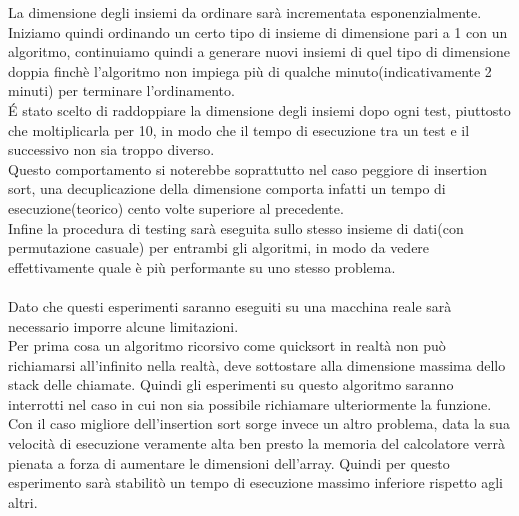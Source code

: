 \documentclass[]{article}
\begin{document}
La dimensione degli insiemi da ordinare sarà incrementata esponenzialmente.\\
Iniziamo quindi ordinando un certo tipo di insieme di dimensione pari a 1 con un algoritmo, continuiamo quindi a generare nuovi insiemi di quel tipo di dimensione doppia finchè l'algoritmo non impiega più di qualche minuto(indicativamente 2 minuti) per terminare l'ordinamento.\\
\'E stato scelto di raddoppiare la dimensione degli insiemi dopo ogni test, piuttosto che moltiplicarla per 10, in modo che il tempo di esecuzione tra un test e il successivo non sia troppo diverso.\\
Questo comportamento si noterebbe soprattutto nel caso peggiore di insertion sort, una decuplicazione della dimensione comporta infatti un tempo di esecuzione(teorico) cento volte superiore al precedente.\\
Infine la procedura di testing sarà eseguita sullo stesso insieme di dati(con permutazione casuale) per entrambi gli algoritmi, in modo da vedere effettivamente quale è più performante su uno stesso problema.\\\\
Dato che questi esperimenti saranno eseguiti su una macchina reale sarà necessario imporre alcune limitazioni.\\
Per prima cosa un algoritmo ricorsivo come quicksort in realtà non può richiamarsi all'infinito nella realtà, deve sottostare alla dimensione massima dello stack delle chiamate. Quindi gli esperimenti su questo algoritmo saranno interrotti nel caso in cui non sia possibile richiamare ulteriormente la funzione.\\
Con il caso migliore dell'insertion sort sorge invece un altro problema, data la sua velocità di esecuzione veramente alta ben presto la memoria del calcolatore verrà pienata a forza di aumentare le dimensioni dell'array. Quindi per questo esperimento sarà stabilitò un tempo di esecuzione massimo inferiore rispetto agli altri.\\
\end{document}
